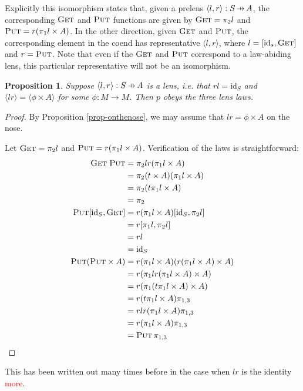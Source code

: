 \documentclass[11pt,a4paper]{article}
\theoremstyle{plain}
\newtheorem{proposition}[theorem]{Proposition}
\theoremstyle{definition}
\newcommand{\id}{\mathrm{id}}
\newcommand{\fget}{\textsc{Get}}
\newcommand{\fput}{\textsc{Put}}
\newcommand{\hto}{\ensuremath{\,\mathaccent\shortmid\rightarrow\,}}
\newcommand{\todo}[1]{\textcolor{red}{\small #1}}
\begin{document}
Explicitly this isomorphism states that, given a prelens $\langle l, r \rangle : S \hto A$, the corresponding $\fget$ and $\fput$ functions are given by $\fget = \pi_2 l$ and $\fput = r (\pi_1 l \times A)$. In the other direction, given $\fget$ and $\fput$, the corresponding element in the coend has representative $\langle l, r \rangle$, where $l = [\id_s, \fget]$ and $r = \fput$. Note that even if the $\fget$ and $\fput$ correspond to a law-abiding lens, this particular representative will not be an isomorphism.

\begin{proposition}
\label{prop-OpticImpliesLensLaws}
Suppose $\langle l, r \rangle : S \hto A$ is a lens, i.e. that $rl = \id_S$ and $\langle lr \rangle = \langle \phi \times A \rangle$ for some $\phi : M \to M$. Then $p$ obeys the three lens laws.
\end{proposition}
\begin{proof}
By Proposition \ref{prop-onthenose}, we may assume that $lr = \phi \times A$ on the nose.

Let $\fget = \pi_2 l$ and $\fput = r (\pi_1 l \times A)$. Verification of the laws is straightforward:
\begin{align*}
\fget \; \fput 
&= \pi_2 l r (\pi_1 l \times A) \\
&= \pi_2 (t \times A) (\pi_1 l \times A) \\
&= \pi_2 (t \pi_1 l \times A) \\
&= \pi_2 \\
\fput [\id_S, \fget] 
&= r (\pi_1 l \times A) [\id_S, \pi_2 l] \\
&= r [\pi_1 l, \pi_2 l] \\
&= rl \\
&= \id_S \\
\fput (\fput \times A) 
&= r (\pi_1 l \times A) (r (\pi_1 l \times A) \times A) \\
&= r (\pi_1 l  r (\pi_1 l \times A) \times A) \\
&= r (\pi_1 (t\pi_1 l \times A) \times A) \\
&= r (t\pi_1 l \times A) \pi_{1,3} \\
&= r lr(\pi_1 l \times A) \pi_{1,3} \\
&= r(\pi_1 l \times A) \pi_{1,3} \\
&= \fput \, \pi_{1, 3}
\end{align*}
\end{proof}

This has been written out many times before in the case when $lr$ is the identity \cite{IsomorphismLensesPost} \todo{more}.
\end{document}
